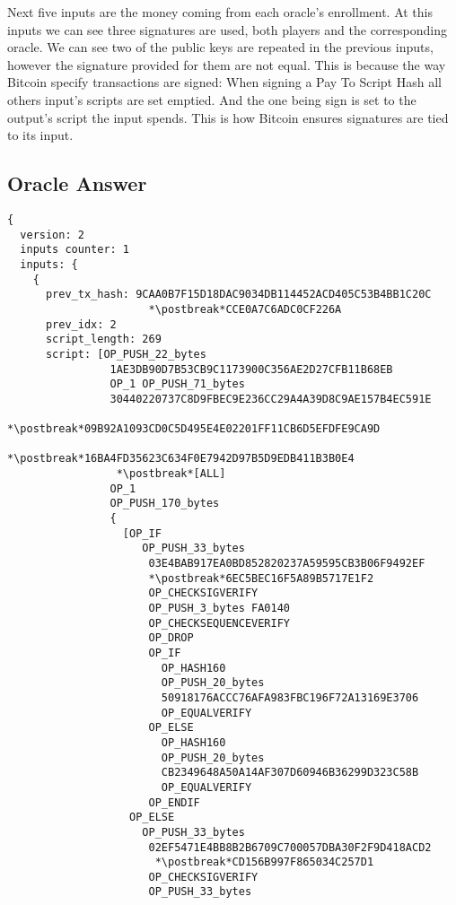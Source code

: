 Next five inputs are the money coming from each oracle's enrollment.
At this inputs we can see three signatures are used, both players and the
  corresponding oracle.
We can see two of the public keys are repeated in the previous inputs, however
  the signature provided for them are not equal.
This is because the way Bitcoin specify transactions are signed: When signing a
  Pay To Script Hash all others input's scripts are set emptied.
And the one being sign is set to the output's script the input spends.
This is how Bitcoin ensures signatures are tied to its input.

\subsection{Oracle Answer}

\begin{lstlisting}
{
  version: 2
  inputs counter: 1
  inputs: {
    {
      prev_tx_hash: 9CAA0B7F15D18DAC9034DB114452ACD405C53B4BB1C20C
                      *\postbreak*CCE0A7C6ADC0CF226A
      prev_idx: 2
      script_length: 269
      script: [OP_PUSH_22_bytes
                1AE3DB90D7B53CB9C1173900C356AE2D27CFB11B68EB
                OP_1 OP_PUSH_71_bytes
                30440220737C8D9FBEC9E236CC29A4A39D8C9AE157B4EC591E
                 *\postbreak*09B92A1093CD0C5D495E4E02201FF11CB6D5EFDFE9CA9D
                 *\postbreak*16BA4FD35623C634F0E7942D97B5D9EDB411B3B0E4
                 *\postbreak*[ALL]
                OP_1
                OP_PUSH_170_bytes
                {
                  [OP_IF
                     OP_PUSH_33_bytes
                      03E4BAB917EA0BD852820237A59595CB3B06F9492EF
                      *\postbreak*6EC5BEC16F5A89B5717E1F2
                      OP_CHECKSIGVERIFY
                      OP_PUSH_3_bytes FA0140
                      OP_CHECKSEQUENCEVERIFY
                      OP_DROP
                      OP_IF
                        OP_HASH160
                        OP_PUSH_20_bytes
                        50918176ACCC76AFA983FBC196F72A13169E3706
                        OP_EQUALVERIFY
                      OP_ELSE
                        OP_HASH160
                        OP_PUSH_20_bytes
                        CB2349648A50A14AF307D60946B36299D323C58B
                        OP_EQUALVERIFY
                      OP_ENDIF
                   OP_ELSE
                     OP_PUSH_33_bytes
                      02EF5471E4BB8B2B6709C700057DBA30F2F9D418ACD2
                       *\postbreak*CD156B997F865034C257D1
                      OP_CHECKSIGVERIFY
                      OP_PUSH_33_bytes

\end{lstlisting}
